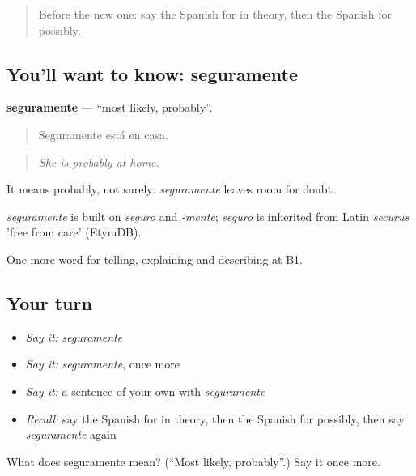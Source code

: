 \label{lesson:ES-C618-seguramente}



\begin{quote}
Before the new one: say the Spanish for in theory, then the Spanish for possibly.
\end{quote}

\subsection*{You'll want to know: seguramente}
\textbf{seguramente} — \textquotedblleft{}most likely, probably\textquotedblright{}.

\begin{quote}
Seguramente está en casa.
\end{quote}

\begin{quote}
\emph{She is probably at home.}
\end{quote}

It means probably, not surely: \emph{seguramente} leaves room for doubt.

\begin{cousinweb}
\emph{seguramente} is built on \emph{seguro} and \emph{-mente}; \emph{seguro} is inherited from Latin \emph{securus} 'free from care' (EtymDB).
\end{cousinweb}

\begin{grammarlens}[title={What you've built}]
One more word for telling, explaining and describing at B1.
\end{grammarlens}

\subsection*{Your turn}
\begin{itemize}
\raggedright
  \item \emph{Say it:} \emph{seguramente}
  \item \emph{Say it:} \emph{seguramente}, once more
  \item \emph{Say it:} a sentence of your own with \emph{seguramente}
  \item \emph{Recall:} say the Spanish for in theory, then the Spanish for possibly, then say \emph{seguramente} again
\end{itemize}

\begin{tcolorbox}[breakable,colback=teal!4,colframe=teal!35!black,title={Before you move on}]
What does seguramente mean? (\textquotedblleft{}Most likely, probably\textquotedblright{}.) Say it once more.
\end{tcolorbox}

